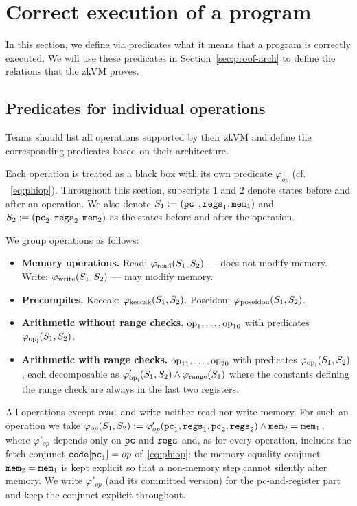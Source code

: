 \section{Correct execution of a program}
In this section, we define via predicates what it means that a program is correctly executed. We will use these predicates in Section~\ref{sec:proof-arch} to define the relations that the zkVM proves.

\subsection{Predicates for individual operations}

\begin{instruction}
Teams should list all operations supported by their zkVM and define the corresponding predicates based on their architecture.
\end{instruction}

Each operation is treated as a black box with its
own predicate $\varphi_{op}$ (cf. ~\eqref{eq:phiop}).
Throughout this section, subscripts $1$ and $2$ denote states before and after an operation.
We also denote $S_1:=(\mathtt{pc}_1,\mathtt{regs}_1,\mathtt{mem}_1)$ and
$S_2:=(\mathtt{pc}_2,\mathtt{regs}_2,\mathtt{mem}_2)$ as the states
before and after the operation.

We group operations as follows:
\begin{itemize}
	\item \textbf{Memory operations.}
	Read: $\varphi_{\mathrm{read}}(S_1,S_2)$ --- does not modify memory.
	Write: $\varphi_{\mathrm{write}}(S_1,S_2)$ --- may modify memory.
	\item \textbf{Precompiles.}
	Keccak: $\varphi_{\mathrm{keccak}}(S_1,S_2)$.
	Poseidon: $\varphi_{\mathrm{poseidon}}(S_1,S_2)$.
	 \item \textbf{Arithmetic without range checks.} $\mathrm{op}_1,\ldots,\mathrm{op}_{10}$
	 with predicates $
   \varphi_{\mathrm{\mathrm{op}_i}}(S_1,S_2)$.
	 \item \textbf{Arithmetic with range checks.} $\mathrm{op}_{11},\ldots,\mathrm{op}_{20}$
	 with predicates $\varphi_{\mathrm{\mathrm{op}_i}}(S_1,S_2)$, each decomposable as
	 $\varphi_{\mathrm{\mathrm{op}_i}}'(S_1,S_2)\wedge \varphi_{\mathrm{range}}(S_1)$
	 where the constants defining the range check are always in the
   last two registers.
\end{itemize}
All operations except $\mathrm{read}$ and $\mathrm{write}$ neither read nor write memory. For
such an operation we take
$\varphi_{op}(S_1,S_2) := \varphi'_{op}(\mathtt{pc}_1,\mathtt{regs}_1,\mathtt{pc}_2,\mathtt{regs}_2) \wedge \mathtt{mem}_2 = \mathtt{mem}_1$,
where $\varphi'_{op}$ depends only on $\mathtt{pc}$ and $\mathtt{regs}$ and, as for every
operation, includes the fetch conjunct $\mathtt{code}[\mathtt{pc}_1]=op$
of~\eqref{eq:phiop}; the memory-equality
conjunct $\mathtt{mem}_2 = \mathtt{mem}_1$ is kept explicit so that a non-memory step cannot
silently alter memory. We write $\varphi'_{op}$ (and its committed version) for
the pc-and-register part and keep the conjunct explicit throughout.
